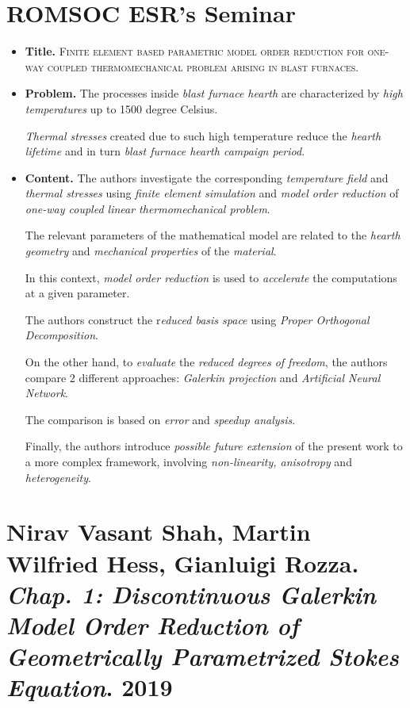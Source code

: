 \documentclass{book}
\numberwithin{equation}{section}
\begin{document}
\section{ROMSOC ESR's Seminar}
\begin{itemize}
    \item \textbf{Title.} \textsc{Finite element based parametric model order reduction for one-way coupled thermomechanical problem arising in blast furnaces}.
    \item \textbf{Problem.} The processes inside \textit{blast furnace hearth} are characterized by \textit{high temperatures} up to 1500 degree Celsius.
    
    \textit{Thermal stresses} created due to such high temperature reduce the \textit{hearth lifetime} and in turn \textit{blast furnace hearth campaign period}.
    \item \textbf{Content.} The authors investigate the corresponding \textit{temperature field} and \textit{thermal stresses} using \textit{finite element simulation} and \textit{model order reduction} of \textit{one-way coupled linear thermomechanical problem}.
    
    The relevant parameters of the mathematical model are related to the \textit{hearth geometry} and \textit{mechanical properties} of the \textit{material}.
    
    In this context, \textit{model order reduction} is used to \textit{accelerate} the computations at a given parameter.
    
    The authors construct the r\textit{educed basis space} using \textit{Proper Orthogonal Decomposition}.
    
    On the other hand, to \textit{evaluate} the \textit{reduced degrees of freedom}, the authors compare 2 different approaches: \textit{Galerkin projection} and \textit{Artificial Neural Network}.
    
    The comparison is based on \textit{error} and \textit{speedup analysis}.
    
    Finally, the authors introduce \textit{possible future extension} of the present work to a more complex framework, involving \textit{non-linearity, anisotropy} and \textit{heterogeneity}.
\end{itemize}

\section{Nirav Vasant Shah, Martin Wilfried Hess, Gianluigi Rozza. \textit{Chap. 1: Discontinuous Galerkin Model Order Reduction of Geometrically Parametrized Stokes Equation}. 2019}
\end{document}
